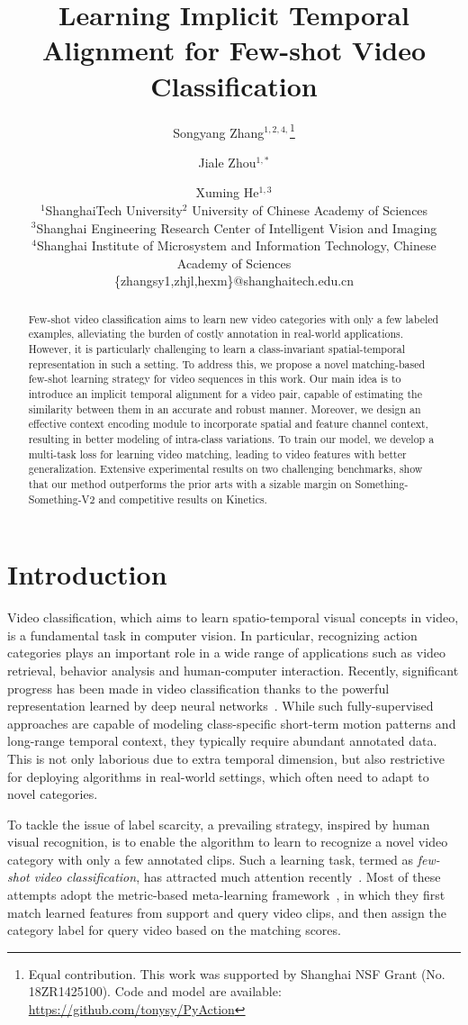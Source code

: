 \documentclass{article}
\title{Learning Implicit Temporal Alignment for Few-shot Video Classification}
\author{
Songyang Zhang$^{1,2,4,}$\footnote{Equal contribution. This work was supported by Shanghai NSF Grant (No. 18ZR1425100). Code and model are available: \href{https://github.com/tonysy/PyAction}{https://github.com/tonysy/PyAction}}\and
Jiale Zhou$^{1,*}$\and
Xuming He$^{1,3}$\\
\affiliations
$^1$ShanghaiTech University\quad $^2$ University of Chinese Academy of Sciences\\ $^3$Shanghai Engineering Research Center of Intelligent Vision and Imaging\\$^4$Shanghai Institute of Microsystem and Information Technology, Chinese Academy of Sciences\\
\emails
\{zhangsy1,zhjl,hexm\}@shanghaitech.edu.cn
}
\begin{document}
\maketitle

\begin{abstract}
Few-shot video classification aims to learn new video categories with only a few labeled examples, alleviating the burden of costly annotation in real-world applications. However, it is particularly challenging to learn a class-invariant  spatial-temporal representation in such a setting. To address this, we propose a novel matching-based few-shot learning strategy for video sequences in this work. 
Our main idea is to introduce an implicit temporal alignment for a video pair, capable of estimating the similarity between them in an accurate and robust manner. Moreover, we design an effective context encoding module to incorporate spatial and feature channel context, resulting in better modeling of intra-class variations. 
To train our model, we develop a multi-task loss for learning video matching, leading to video features with better generalization. 
Extensive experimental results on two challenging benchmarks, show that our method outperforms the prior arts with a sizable margin on Something-Something-V2 and competitive results on Kinetics.
\end{abstract}

\section{Introduction}\label{sec:introduction}
Video classification, which aims to learn spatio-temporal visual concepts in video, is a fundamental task in computer vision. In particular, recognizing action categories plays an important role in a wide range of applications such as video retrieval, behavior analysis and human-computer interaction. Recently, significant progress has been made in video classification thanks to the powerful representation learned by deep neural networks~\cite{wang2016temporal,carreira2017quo,wang2018non}. 
While such fully-supervised approaches are capable of modeling class-specific short-term motion patterns and long-range temporal context, they typically require abundant annotated data. This is not only laborious due to extra temporal dimension, but also restrictive for deploying algorithms in real-world settings, which often need to adapt to novel categories.  


To tackle the issue of label scarcity, a prevailing strategy, inspired by human visual recognition, is to enable the algorithm to learn to recognize a novel video category with only a few annotated clips. Such a learning task, termed as \textit{few-shot video classification}, has attracted much attention recently~\cite{zhu2018compound,cao2020few,zhang2020few}. 
Most of these attempts adopt the metric-based meta-learning framework~\cite{vinyals2016matching}, in which they first match learned features from support and query video clips, and then assign the category label for query video based on the matching scores. 
\end{document}
